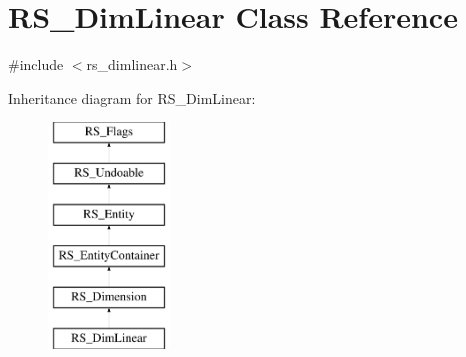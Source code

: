 \hypertarget{classRS__DimLinear}{\section{R\-S\-\_\-\-Dim\-Linear Class Reference}
\label{classRS__DimLinear}
}


{\ttfamily \#include $<$rs\-\_\-dimlinear.\-h$>$}

Inheritance diagram for R\-S\-\_\-\-Dim\-Linear\-:\begin{figure}[H]
\begin{center}
\leavevmode
\includegraphics[height=6.000000cm]{classRS__DimLinear}
\end{center}
\end{figure}

